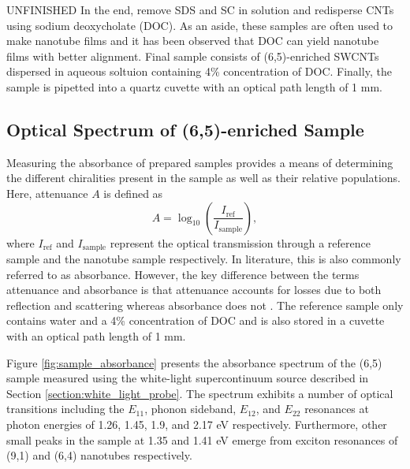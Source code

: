 {\color{red} UNFINISHED} In the end, remove SDS and SC in solution and redisperse CNTs using sodium deoxycholate (DOC). As an aside, these samples are often used to make nanotube films and it has been observed that DOC can yield nanotube films with better alignment. Final sample consists of (6,5)-enriched SWCNTs dispersed in aqueous soltuion containing 4\% concentration of DOC. Finally, the sample is pipetted into a quartz cuvette with an optical path length of 1 mm.

\subsection{Optical Spectrum of (6,5)-enriched Sample}

Measuring the absorbance of prepared samples provides a means of determining the different chiralities present in the sample as well as their relative populations. Here, attenuance $A$ is defined as
\begin{equation}
A = \log_{10}\left(\dfrac{I_{\mathrm{ref}}}{I_{\mathrm{sample}}}\right),
\end{equation}
where $I_{\mathrm{ref}}$ and $I_{\mathrm{sample}}$ represent the optical transmission through a reference sample and the nanotube sample respectively. In literature, this is also commonly referred to as absorbance. However, the key difference between the terms attenuance and absorbance is that attenuance accounts for losses due to both reflection and scattering whereas absorbance does not \cite{dixon1992absorbance}. The reference sample only contains water and a 4\% concentration of DOC and is also stored in a cuvette with an optical path length of 1 mm.

Figure \ref{fig:sample_absorbance} presents the absorbance spectrum of the (6,5) sample measured using the white-light supercontinuum source described in Section \ref{section:white_light_probe}. The spectrum exhibits a number of optical transitions including the $E_{11}$, phonon sideband, $E_{12}$, and $E_{22}$ resonances at photon energies of 1.26, 1.45, 1.9, and 2.17 eV respectively. Furthermore, other small peaks in the sample at 1.35 and 1.41 eV emerge from exciton resonances of (9,1) and (6,4) nanotubes respectively.

